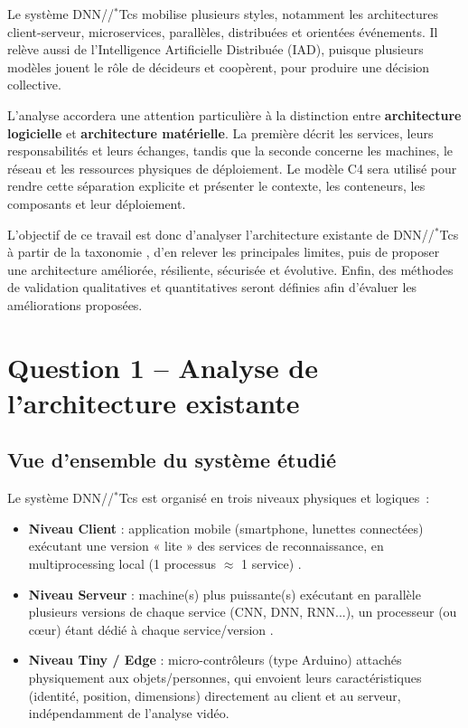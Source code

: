 \documentclass[11pt,a4paper]{article}
\begin{document}
Le système DNN//$^{*}$Tcs mobilise plusieurs styles, notamment les architectures client-serveur, microservices, parallèles, distribuées et orientées événements. Il relève aussi de l'Intelligence Artificielle Distribuée (IAD), puisque plusieurs modèles jouent le rôle de décideurs et coopèrent, pour produire une décision collective.

L'analyse accordera une attention particulière à la distinction entre \textbf{architecture logicielle} et \textbf{architecture matérielle}. La première décrit les services, leurs responsabilités et leurs échanges, tandis que la seconde concerne les machines, le réseau et les ressources physiques de déploiement. Le modèle C4 sera utilisé pour rendre cette séparation explicite et présenter le contexte, les conteneurs, les composants et leur déploiement.

L'objectif de ce travail est donc d'analyser l'architecture existante de DNN//$^{*}$Tcs à partir de la taxonomie , d'en relever les principales limites, puis de proposer une architecture améliorée, résiliente, sécurisée et évolutive. Enfin, des méthodes de validation qualitatives et quantitatives seront définies afin d'évaluer les améliorations proposées.

\newpage
\section{Question 1 -- Analyse de l'architecture existante}

\subsection{Vue d'ensemble du système étudié}
Le système DNN//$^{*}$Tcs est organisé en trois niveaux physiques et logiques~:
\begin{itemize}
\item \textbf{Niveau Client} : application mobile (smartphone, lunettes connectées) exécutant une version « lite » des services de reconnaissance, en multiprocessing local (1 processus $\approx$ 1 service) .
\item \textbf{Niveau Serveur} : machine(s) plus puissante(s) exécutant en parallèle plusieurs versions de chaque service (CNN, DNN, RNN...), un processeur (ou cœur) étant dédié à chaque service/version .
\item \textbf{Niveau Tiny / Edge} : micro-contrôleurs (type Arduino) attachés physiquement aux objets/personnes, qui envoient leurs caractéristiques (identité, position, dimensions) directement au client et au serveur, indépendamment de l'analyse vidéo.
\end{itemize}
\end{document}
